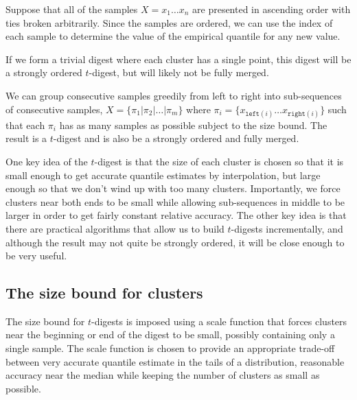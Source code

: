 \documentclass[]{statsoc}
\begin{document}
Suppose that all of the samples $X=x_1 \ldots x_n$ are presented in ascending order with ties broken arbitrarily. Since the samples are ordered, we can use the index of each sample to determine the value of the empirical quantile for any new value. 

If we form a trivial digest where each cluster has a single point, this digest will be a strongly ordered $t$-digest, but will likely not be fully merged.

We can group consecutive samples greedily from left to right into sub-sequences of consecutive samples, $X = \lbrace \pi_1 | \pi_2 | \ldots | \pi_m \rbrace$ where $\pi_i = \lbrace x_{\mathtt {left}(i)} \ldots x_{\mathtt{right}(i)} \rbrace$ such that each $\pi_i$ has as many samples as possible subject to the size bound. The result is a $t$-digest and is also be a strongly ordered and fully merged.

One key idea of the $t$-digest is that the size of each cluster is chosen so that it is small enough to get accurate quantile estimates by interpolation, but large enough so that we don't wind up with too many clusters. Importantly, we force clusters near both ends to be small while allowing sub-sequences in middle to be larger in order to get fairly constant relative accuracy. The other key idea is that there are practical algorithms that allow us to build $t$-digests incrementally, and although the result may not quite be strongly ordered, it will be close enough to be very useful.

\subsection{The size bound for clusters}
The size bound for $t$-digests is imposed using a scale function that forces clusters near the beginning or end of the digest to be small, possibly containing only a single sample. The scale function is chosen to provide an appropriate trade-off between very accurate quantile estimate in the tails of a distribution, reasonable accuracy near the median while keeping the number of clusters as small as possible.
\end{document}

